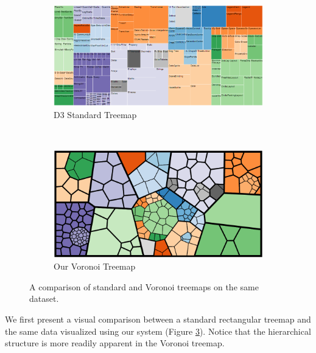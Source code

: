 \documentclass{acm_proc_article-sp} \usepackage{cite}
\begin{document}
\begin{figure}
        \centering
        \begin{subfigure}[b]{0.45\textwidth}
                \includegraphics[width=\textwidth]{source-images/d3-treemap-flare.png}
                \caption{D3 Standard Treemap}
                \label{fig:treemapflare}
        \end{subfigure}%
        ~ %
	\qquad
        \begin{subfigure}[b]{0.45\textwidth}
                \includegraphics[width=\textwidth]{source-images/voronoi-flare-960-500-cropped.png}
                \caption{Our Voronoi Treemap}
                \label{fig:voronoiflare}
        \end{subfigure}
        \caption{A comparison of standard and Voronoi treemaps on the same dataset.}\label{fig:comparestandard}
\end{figure}


We first present a visual comparison between a standard rectangular treemap and the
same data visualized using our system (Figure \ref{fig:comparestandard}).
Notice that the hierarchical structure is more readily
apparent in the Voronoi treemap.
\end{document}
